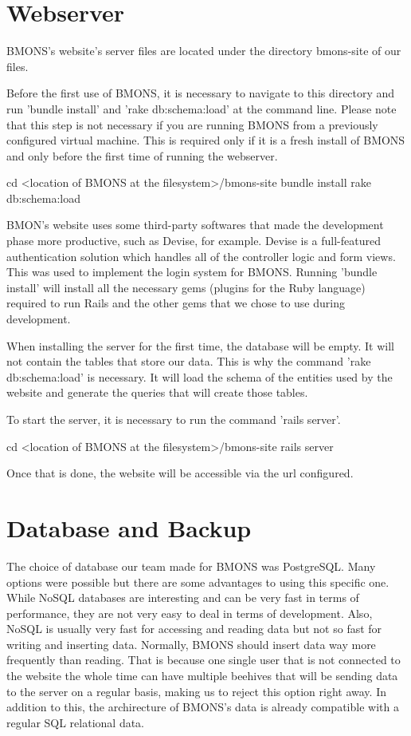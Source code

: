\section{Webserver}

BMONS's website's server files are located under the directory bmons-site of our files. 

Before the first use of BMONS, it is necessary to navigate to this directory and run 'bundle install' and 'rake db:schema:load' at the command line. Please note that this step is not necessary if you are running BMONS from a previously configured virtual machine. This is required only if it is a fresh install of BMONS and only before the first time of running the webserver.

cd <location of BMONS at the filesystem>/bmons-site
bundle install
rake db:schema:load

BMON's website uses some third-party softwares that made the development phase more productive, such as Devise, for example. Devise is a full-featured authentication solution which handles all of the controller logic and form views. This was used to implement the login system for BMONS. Running 'bundle install' will install all the necessary gems (plugins for the Ruby language) required to run Rails and the other gems that we chose to use during development. 

When installing the server for the first time, the database will be empty. It will not contain the tables that store our data. This is why the command 'rake db:schema:load' is necessary. It will load the schema of the entities used by the website and generate the queries that will create those tables.

To start the server, it is necessary to run the command 'rails server'.

cd <location of BMONS at the filesystem>/bmons-site
rails server

Once that is done, the website will be accessible via the url configured.

\section{Database and Backup}

The choice of database our team made for BMONS was PostgreSQL. Many options were possible but there are some advantages to using this specific one. While NoSQL databases are interesting and can be very fast in terms of performance, they are not very easy to deal in terms of development. Also, NoSQL is usually very fast for accessing and reading data but not so fast for writing and inserting data. Normally, BMONS should insert data way more frequently than reading. That is because one single user that is not connected to the website the whole time can have multiple beehives that will be sending data to the server on a regular basis, making us to reject this option right away. In addition to this, the archirecture of BMONS's data is already compatible with a regular SQL relational data.

